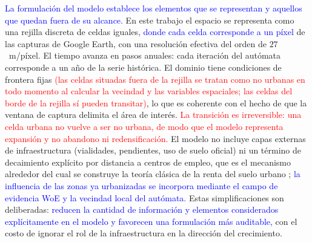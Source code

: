 \textcolor{blue}{La formulación del modelo establece los elementos que se
representan y aquellos que quedan fuera de su alcance.} En este trabajo el
espacio se representa como una rejilla discreta de celdas iguales, \textcolor{blue}{donde
cada celda corresponde a un píxel} de las capturas de Google Earth, con una
resolución efectiva del orden de $27$~m/píxel. El tiempo avanza en pasos
anuales: cada iteración del autómata corresponde a un año de la serie
histórica. El dominio tiene condiciones de frontera fijas \textcolor{red}{(las
celdas situadas fuera de la rejilla se tratan como no urbanas en todo momento
al calcular la vecindad y las variables espaciales; las celdas del borde de la
rejilla sí pueden transitar)}, lo que es coherente con el hecho de que
la ventana de captura delimita el área de interés. \textcolor{red}{La
transición es irreversible: una celda urbana no vuelve a ser no urbana, de modo
que el modelo representa expansión y no abandono ni redensificación.} El modelo no incluye capas
externas de infraestructura (vialidades, pendientes, uso de suelo oficial) ni
un término de decaimiento explícito por distancia a centros de empleo, que es
el mecanismo alrededor del cual se construye la teoría clásica de la renta del
suelo urbano \parencite{alonso1964location}; \textcolor{blue}{la influencia de
las zonas ya urbanizadas se incorpora mediante el campo de evidencia WoE y la
vecindad local del autómata.} Estas simplificaciones son deliberadas:
\textcolor{blue}{reducen la cantidad de información y elementos considerados
explícitamente en el modelo y favorecen una formulación más auditable,} con el
costo de ignorar el rol de la infraestructura en la dirección del crecimiento.


